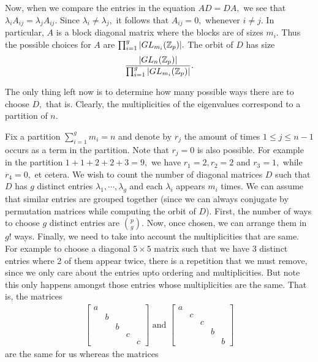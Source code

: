 \documentclass[11pt, titlepage, a4paper]{article}
\begin{document}
Now, when we compare the entries in the equation $AD=DA,$ we see that $\lambda_{i}A_{ij} = \lambda_{j}A_{ij}.$ Since $\lambda_{i} \neq \lambda_{j},$ it follows that $A_{ij} = 0,$ whenever $i\neq j.$ In particular, $A$ is a block diagonal matrix where the blocks are of sizes $m_{i}.$ Thus the possible choices for $A$ are $\prod_{i=1}^{g} |GL_{m_{i}}(\mathbb{Z}_{p})|.$ The orbit of $D$ has size
\begin{align*}
 \frac{|GL_{n}(\mathbb{Z}_{p})|}{\prod_{i=1}^{g} |GL_{m_{i}}(\mathbb{Z}_{p})|}.
\end{align*}

The only thing left now is to determine how many possible ways there are to choose $D,$ that is. Clearly, the multiplicities of the eigenvalues correspond to a partition of $n.$ 

Fix a partition $\sum_{i=1}^{g} m_{i}=n$ and denote by $r_{j}$ the amount of times $1\leq j \leq n-1$ occurs as a term in the partition. Note that $r_{j}=0$ is also possible. For example in the partition $1+1+2+2+3 = 9,$ we have $r_{1}=2, r_{2}=2$ and $r_{3}=1,$ while $r_{4}=0,$ et cetera. We wish to count the number of diagonal matrices $D$ such that $D$ has $g$ distinct entries $\lambda_{1},\cdots,\lambda_{g}$ and each $\lambda_{i}$ appears $m_{i}$ times. We can assume that similar entries are grouped together (since we can always conjugate by permutation matrices while computing the orbit of $D$). First, the number of ways to choose $g$ distinct entries are $\binom{p}{g}.$ Now, once chosen, we can arrange them in $g!$ ways. Finally, we need to take into account the multiplicities that are same. For example to choose a diagonal $5\times 5$ matrix such that we have 3 distinct entries where 2 of them appear twice, there is a repetition that we must remove, since we only care about the entries upto ordering and multiplicities. But note this only happens amongst those entries whose multiplicities are the same. That is, the matrices 
\begin{align*}
 \begin{bmatrix}
 a & & & & \\
  &b & & & \\
  & &b & & \\
  & & & c& \\
  & & & &c 
\end{bmatrix} \text{ and }  \begin{bmatrix}
 a & & & & \\
  &c & & & \\
  & &c & & \\
  & & & b& \\
  & & & &b 
\end{bmatrix}
\end{align*} are the same for us whereas the matrices 
\end{document}
